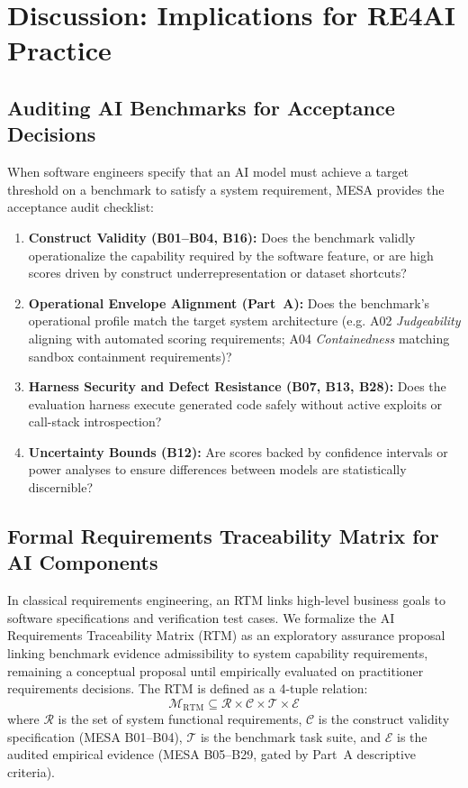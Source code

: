 \documentclass[runningheads]{llncs}
\begin{document}
\section{Discussion: Implications for RE4AI Practice}
\label{sec:discussion}

\subsection{Auditing AI Benchmarks for Acceptance Decisions}
When software engineers specify that an AI model must achieve a target threshold on a benchmark to satisfy a system requirement, MESA provides the acceptance audit checklist:
\begin{enumerate}[leftmargin=*]
    \item \textbf{Construct Validity (B01--B04, B16):} Does the benchmark validly operationalize the capability required by the software feature, or are high scores driven by construct underrepresentation or dataset shortcuts?
    \item \textbf{Operational Envelope Alignment (Part~A):} Does the benchmark's operational profile match the target system architecture (e.g. A02 \emph{Judgeability} aligning with automated scoring requirements; A04 \emph{Containedness} matching sandbox containment requirements)?
    \item \textbf{Harness Security and Defect Resistance (B07, B13, B28):} Does the evaluation harness execute generated code safely without active exploits or call-stack introspection?
    \item \textbf{Uncertainty Bounds (B12):} Are scores backed by confidence intervals or power analyses to ensure differences between models are statistically discernible?
\end{enumerate}

\subsection{Formal Requirements Traceability Matrix for AI Components}
In classical requirements engineering, an RTM links high-level business goals to software specifications and verification test cases. We formalize the AI Requirements Traceability Matrix (RTM) as an exploratory assurance proposal linking benchmark evidence admissibility to system capability requirements, remaining a conceptual proposal until empirically evaluated on practitioner requirements decisions. The RTM is defined as a 4-tuple relation:
\[
\mathcal{M}_{\text{RTM}} \subseteq \mathcal{R} \times \mathcal{C} \times \mathcal{T} \times \mathcal{E}
\]
where $\mathcal{R}$ is the set of system functional requirements, $\mathcal{C}$ is the construct validity specification (MESA B01--B04), $\mathcal{T}$ is the benchmark task suite, and $\mathcal{E}$ is the audited empirical evidence (MESA B05--B29, gated by Part~A descriptive criteria). 
\end{document}
